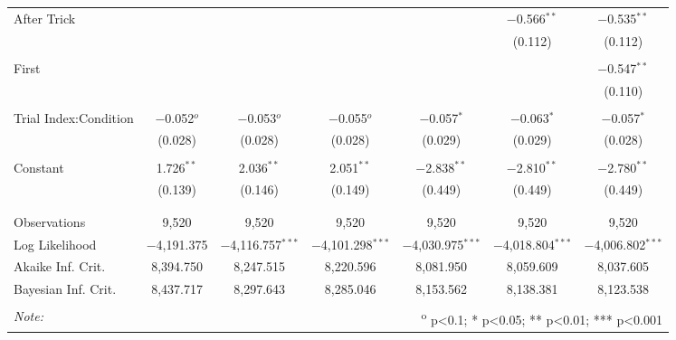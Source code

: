 \begin{table}
\begin{tabular}{@{\extracolsep{5pt}}lcccccc}
 After Trick &  &  &  &  & $-$0.566$^{**}$ & $-$0.535$^{**}$ \\
  &  &  &  &  & (0.112) & (0.112) \\
  & & & & & & \\
 First &  &  &  &  &  & $-$0.547$^{**}$ \\
  &  &  &  &  &  & (0.110) \\
  & & & & & & \\
 Trial Index:Condition & $-$0.052$^{o}$ & $-$0.053$^{o}$ & $-$0.055$^{o}$ & $-$0.057$^{*}$ & $-$0.063$^{*}$ & $-$0.057$^{*}$ \\
  & (0.028) & (0.028) & (0.028) & (0.029) & (0.029) & (0.028) \\
  & & & & & & \\
 Constant & 1.726$^{**}$ & 2.036$^{**}$ & 2.051$^{**}$ & $-$2.838$^{**}$ & $-$2.810$^{**}$ & $-$2.780$^{**}$ \\
  & (0.139) & (0.146) & (0.149) & (0.449) & (0.449) & (0.449) \\
  & & & & & & \\
\hline \\[-1.8ex]
Observations & 9,520 & 9,520 & 9,520 & 9,520 & 9,520 & 9,520 \\
Log Likelihood & $-$4,191.375 & $-$4,116.757$^{***}$ & $-$4,101.298$^{***}$ & $-$4,030.975$^{***}$ & $-$4,018.804$^{***}$ & $-$4,006.802$^{***}$ \\
Akaike Inf. Crit. & 8,394.750 & 8,247.515 & 8,220.596 & 8,081.950 & 8,059.609 & 8,037.605 \\
Bayesian Inf. Crit. & 8,437.717 & 8,297.643 & 8,285.046 & 8,153.562 & 8,138.381 & 8,123.538 \\
\hline
\hline \\[-1.8ex]
\textit{Note:}  & \multicolumn{6}{r}{	\textsuperscript{o} p<0.1; * p<0.05; ** p<0.01; *** p<0.001} \\
\end{tabular}
\end{table}
